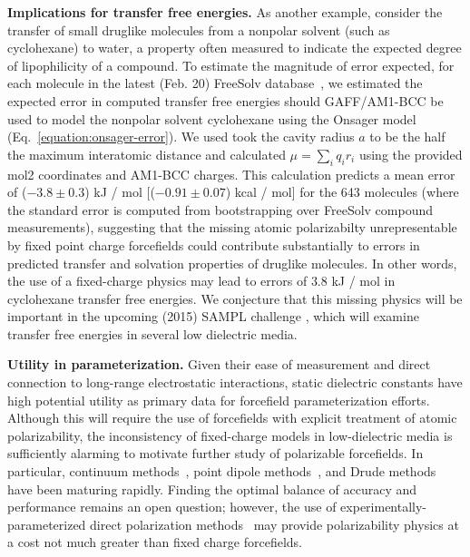 \documentclass[aip, jcp, reprint]{revtex4-1}  %
\begin{document}
{\bf Implications for transfer free energies.}
As another example, consider the transfer of small druglike molecules from a nonpolar solvent (such as cyclohexane) to water, a property often measured to indicate the expected degree of lipophilicity of a compound.
To estimate the magnitude of error expected, for each molecule in the latest (Feb. 20) FreeSolv database~\cite{freesolv, freesolv_github}, we estimated the expected error in computed transfer free energies should GAFF/AM1-BCC be used to model the nonpolar solvent cyclohexane using the Onsager model (Eq.~\ref{equation:onsager-error}).
We used took the cavity radius $a$ to be the half the maximum interatomic distance and calculated $\mu = \sum_i q_i r_i$ using the provided mol2 coordinates and AM1-BCC charges.  
This calculation predicts a mean error of ($-3.8 \pm 0.3$) kJ / mol [($-0.91 \pm0.07$) kcal / mol] for the 643 molecules (where the standard error is computed from bootstrapping over FreeSolv compound measurements), 
suggesting that the missing atomic polarizabilty unrepresentable by fixed point charge forcefields could contribute substantially to errors in predicted transfer and solvation properties of druglike molecules.  
In other words, the use of a fixed-charge physics may lead to errors of $3.8$ kJ / mol in cyclohexane transfer free energies.  
We conjecture that this missing physics will be important in the upcoming (2015) SAMPL challenge \cite{newman2009practical}, which will examine transfer free energies in several low dielectric media. 

{\bf Utility in parameterization.}
Given their ease of measurement and direct connection to long-range electrostatic interactions, static dielectric constants have high potential utility as primary data for forcefield parameterization efforts.  
Although this will require the use of forcefields with explicit treatment of atomic polarizability, the inconsistency of fixed-charge models in low-dielectric media is sufficiently alarming to motivate further study of polarizable forcefields.  In particular, continuum methods~\cite{truchon2010using, truchon2009integrated, truchon2008accurate}, point dipole methods~\cite{Ponder2010, ren2004temperature}, and Drude methods~\cite{lamoureux2003modeling, anisimov2005determination} have been maturing rapidly.  Finding the optimal balance of accuracy and performance remains an open question; however, the use of experimentally-parameterized direct polarization methods~\cite{wang2013systematic} may provide polarizability physics at a cost not much greater than fixed charge forcefields.
\end{document}
